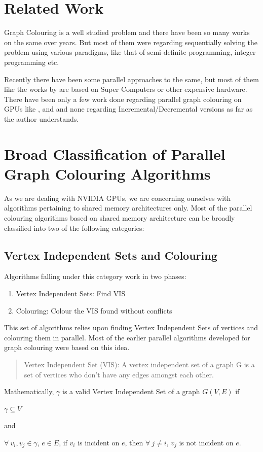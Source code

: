 \documentclass[MTech]{iitmdiss}
\begin{document}
\section{Related Work}
Graph Colouring is a well studied problem and there have been so many works on the same over years. But most of them were regarding sequentially solving the problem using various paradigms, like that of semi-definite programming, integer programming etc.

Recently there have been some parallel approaches to the same, but most of them like the works by \citet{CAtalyuRek:2012:GCA:2396901.2397093} are based on Super Computers or other expensive hardware. There have been only a few work done regarding parallel graph colouring on GPUs like \citet{Grosset:2011:EGC:2038037.1941597}, \citet{nvidia:naumov} and \citet{6828158} and none regarding Incremental/Decremental versions as far as the author understands.
\section{Broad Classification of Parallel Graph Colouring Algorithms}
As we are dealing with NVIDIA GPUs, we are concerning ourselves with algorithms pertaining to shared memory architectures only. Most of the parallel colouring algorithms based on shared memory architecture can be broadly classified into two of the following categories:
\subsection{Vertex Independent Sets and Colouring}
Algorithms falling under this category work in two phases:
\begin{enumerate}
\item Vertex Independent Sets: Find VIS
\item Colouring: Colour the VIS found without conflicts
\end{enumerate}

This set of algorithms relies upon finding  Vertex Independent Sets of vertices and colouring them in parallel. Most of the earlier parallel algorithms developed for graph colouring were based on this idea.

\begin{verse}
Vertex Independent Set (VIS): A vertex independent set of a graph G is a set of vertices who don't have any edges amongst each other.   
\end{verse}

Mathematically, $\gamma$ is a valid Vertex Independent Set of a graph $G(V,E)$ if
\begin{center}
$\gamma \subseteq V$

and

$\forall \: v_{i}, v_{j}\in\gamma$, $e\in E$, if $v_{i}$ is incident on $e$, then $\forall \: j \neq i$, $v_{j}$ is not incident on $e$.
\end{center}
\end{document}
